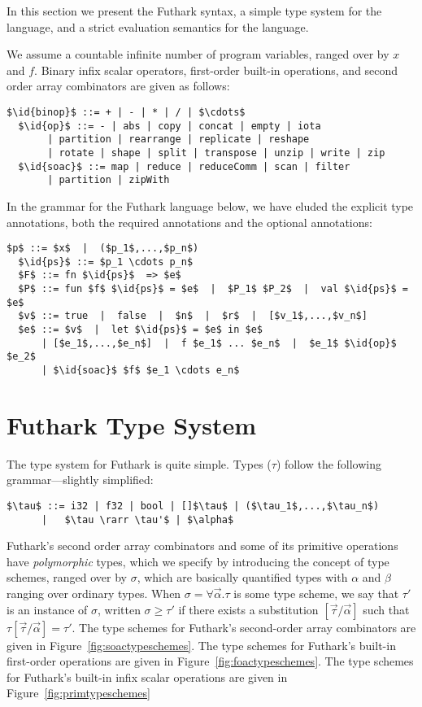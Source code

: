 \documentclass[11pt]{book}
\begin{document}
In this section we present the Futhark syntax, a simple type system
for the language, and a strict evaluation semantics for the language.

We assume a countable infinite number of program variables, ranged over
by $x$ and $f$. Binary infix scalar operators, first-order built-in operations, and
second order array combinators are given as follows:

\begin{lstlisting}[mathescape=true]
  $\id{binop}$ ::= + | - | * | / | $\cdots$
  $\id{op}$ ::= - | abs | copy | concat | empty | iota
       | partition | rearrange | replicate | reshape
       | rotate | shape | split | transpose | unzip | write | zip
  $\id{soac}$ ::= map | reduce | reduceComm | scan | filter
       | partition | zipWith
\end{lstlisting}

In the grammar for the Futhark language below, we have eluded the
explicit type annotations, both the required annotations and the
optional annotations:

\begin{lstlisting}[mathescape=true]
  $p$ ::= $x$  |  ($p_1$,...,$p_n$)
  $\id{ps}$ ::= $p_1 \cdots p_n$
  $F$ ::= fn $\id{ps}$  => $e$
  $P$ ::= fun $f$ $\id{ps}$ = $e$  |  $P_1$ $P_2$  |  val $\id{ps}$ = $e$
  $v$ ::= true  |  false  |  $n$  |  $r$  |  [$v_1$,...,$v_n$]
  $e$ ::= $v$  |  let $\id{ps}$ = $e$ in $e$
      | [$e_1$,...,$e_n$]  |  f $e_1$ ... $e_n$  |  $e_1$ $\id{op}$ $e_2$
      | $\id{soac}$ $f$ $e_1 \cdots e_n$
\end{lstlisting}

\section{Futhark Type System}
The type system for Futhark is quite simple. Types ($\tau$) follow the following grammar---slightly simplified:
\begin{lstlisting}[mathescape=true]
  $\tau$ ::= i32 | f32 | bool | []$\tau$ | ($\tau_1$,...,$\tau_n$)
      |   $\tau \rarr \tau'$ | $\alpha$
\end{lstlisting}

Futhark's second order array combinators and some of its primitive
operations have \emph{polymorphic} types, which we specify by
introducing the concept of type schemes, ranged over by $\sigma$,
which are basically quantified types with $\alpha$ and $\beta$ ranging
over ordinary types. When $\sigma=\forall\vec{\alpha}.\tau$ is some
type scheme, we say that $\tau'$ is an instance of $\sigma$, written
$\sigma \geq \tau'$ if there exists a substitution
$[\vec{\tau}/\vec{\alpha}]$ such that $\tau[\vec{\tau}/\vec{\alpha}] =
\tau'$. The type schemes for Futhark's second-order array combinators
are given in Figure~\ref{fig:soactypeschemes}. The type schemes for
Futhark's built-in first-order operations are given in
Figure~\ref{fig:foactypeschemes}. The type schemes for
Futhark's built-in infix scalar operations are given in
Figure~\ref{fig:primtypeschemes}
\end{document}
